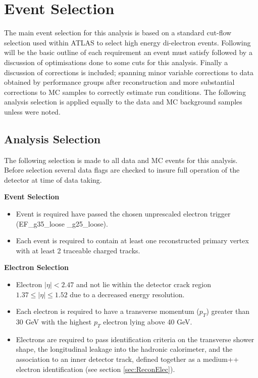 \chapter{Event Selection}

The main event selection for this analysis is based on a standard cut-flow selection used within ATLAS to select high energy di-electron events. Following will be the basic outline of each requirement an event must satisfy followed by a discussion of optimisations done to some cuts for this analysis. Finally a discussion of corrections is included; spanning minor variable corrections to data obtained by performance groups after reconstruction and more substantial corrections to MC samples to correctly estimate run conditions.
The following analysis selection is applied equally to the data and MC background samples unless were noted.


\section{Analysis Selection}

The following selection is made to all data and MC events for this analysis. Before selection several data flags are checked to insure full operation of the detector at time of data taking. 

{\bf Event Selection}
\begin{itemize}
\item Event is required have passed the chosen unprescaled electron trigger (EF\_g35\_loose \_g25\_loose).
\item Each event is required to contain at least one reconstructed primary vertex with at least 2 traceable charged tracks.
\end{itemize}


{\bf Electron Selection}
\begin{itemize}
\item Electron $|\eta| < 2.47$ and not lie within the detector crack region $1.37 \leq |\eta| \leq 1.52$ due to a decreased energy resolution.
\item Each electron is required to have a transverse momentum ($p_{T}$) greater than 30 GeV with the highest $p_{T}$ electron lying above 40 GeV.
\item Electrons are required to pass identification criteria on the transverse shower shape, the longitudinal leakage into the hadronic calorimeter, and the association to an inner detector track, defined together as a medium++ electron identification (see section \ref{sec:ReconElec}).
\end{itemize}


